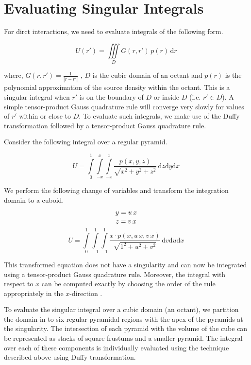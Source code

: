 \documentclass[11pt]{article}
\begin{document}
\section{Evaluating Singular Integrals}
\label{sec:singular_integ}
For dirct interactions, we need to evaluate integrals of the following form.

\begin{equation}
U(r')=\iiint\limits_D{G(r,r')\,p(r)\,\mathrm{d}r}
\end{equation}

where, $G(r,r')=\frac{1}{|r-r'|}$ , $D$ is the cubic domain of an octant and 
$p(r)$ is the polynomial approximation of the source density within the octant.
This is a singular integral when $r'$ is on the boundary of $D$ or inside $D$ 
(i.e. $r' \in D$). A simple tensor-product Gauss quadrature rule will converge 
very slowly for values of $r'$ within or close to $D$. To evaluate such 
integrals, we make use of the Duffy transformation followed by a tensor-product 
Gauss quadrature rule.


Consider the following integral over a regular pyramid.

\begin{equation}
U=\int\limits_{0}^{1}\int\limits_{-x}^{x}\int\limits_{-x}^{x}{\frac{p(x,y,z)}{\sqrt{x^2+y^2+z^2}}\,\mathrm{d}z\mathrm{d}y\mathrm{d}x}
\end{equation}

We perform the following change of variables and transform the integration 
domain to a cuboid.

\begin{equation}
y=u\,x \notag
\end{equation}
\begin{equation}
z=v\,x \notag
\end{equation}
\begin{equation}
U=\int\limits_{0}^{1}\int\limits_{-1}^{1}\int\limits_{-1}^{1}{\frac{x \cdot p(x,u\,x,v\,x)}{\sqrt{1^2+u^2+v^2}}\,\mathrm{d}v\mathrm{d}u\mathrm{d}x}
\end{equation}

This transformed equation does not have a singularity and can now be integrated 
using a tensor-product Gauss quadrature rule. Moreover, the integral with 
respect to $x$ can be computed exactly by choosing the order of the rule 
appropriately in the $x$-direction \cite{Mousavi_2010}.


To evaluate the singular integral over a cubic domain (an octant), we partition 
the domain in to six regular pyramidal regions with the apex of the pyramids at 
the singularity. The intersection of each pyramid with the volume of the cube 
can be represented as stacks of square frustums and a smaller pyramid. The 
integral over each of these components is individually evaluated using the 
technique described above using Duffy transformation. 
\end{document}
